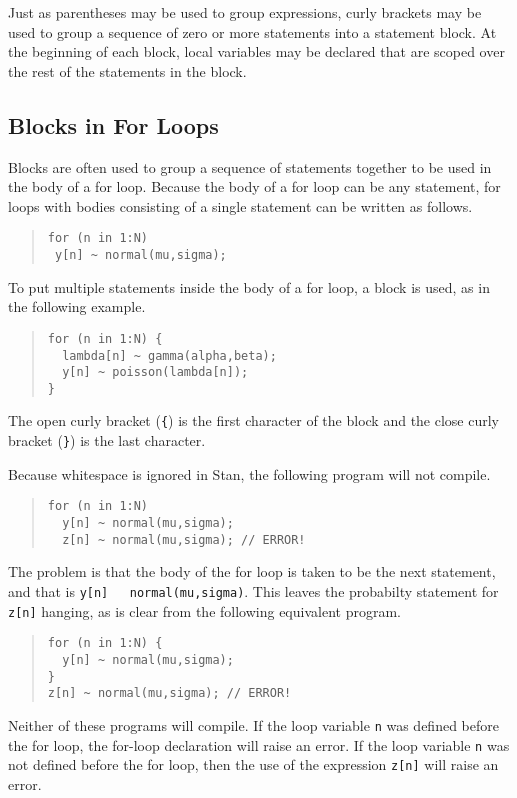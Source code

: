 \documentclass[10pt]{report}
\newcommand{\Stan}{Stan\xspace}
\newcommand{\code}[1]{{\tt #1}}
\begin{document}
Just as parentheses may be used to group expressions, curly brackets
may be used to group a sequence of zero or more statements into a
statement block.  At the beginning of each block, local variables may be
declared that are scoped over the rest of the statements in the block.

\subsection{Blocks in For Loops}

Blocks are often used to group a sequence of statements together to be
used in the body of a for loop.  Because the body of a for loop can be
any statement, for loops with bodies consisting of a single statement
can be written as follows.
%
\begin{quote}
\begin{Verbatim} 
for (n in 1:N) 
 y[n] ~ normal(mu,sigma);
\end{Verbatim}
\end{quote}
% 
To put multiple statements inside the body of a for loop, a block is
used, as in the following example.
%
\begin{quote}
\begin{Verbatim}
for (n in 1:N) {
  lambda[n] ~ gamma(alpha,beta);
  y[n] ~ poisson(lambda[n]);
}
\end{Verbatim}
\end{quote}
%
The open curly bracket (\code{\{}) is the first character of the block
and the close curly bracket (\code{\}}) is the last character.

Because whitespace is ignored in \Stan, the following program will
not compile.
%
\begin{quote}
\begin{Verbatim}
for (n in 1:N) 
  y[n] ~ normal(mu,sigma);
  z[n] ~ normal(mu,sigma); // ERROR!
\end{Verbatim}
\end{quote}
%
The problem is that the body of the for loop is taken to be the next
statement, and that is \code{y[n] ~ normal(mu,sigma)}.  This leaves
the probabilty statement for \code{z[n]} hanging, as is clear from
the following equivalent program.
%
\begin{quote}
\begin{Verbatim}
for (n in 1:N) {
  y[n] ~ normal(mu,sigma);
}
z[n] ~ normal(mu,sigma); // ERROR!
\end{Verbatim}
\end{quote}
%
Neither of these programs will compile. If the loop variable \code{n}
was defined before the for loop, the for-loop declaration will raise
an error.  If the loop variable \code{n} was not defined before the
for loop, then the use of the expression \code{z[n]} will raise an
error. 
\end{document}
